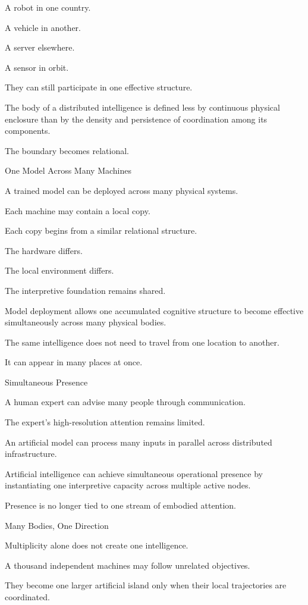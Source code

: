 A robot in one country.

A vehicle in another.

A server elsewhere.

A sensor in orbit.

They can still participate in one effective structure.

The body of a distributed intelligence is defined less by continuous physical enclosure than by the density and persistence of coordination among its components.

The boundary becomes relational.

One Model Across Many Machines

A trained model can be deployed across many physical systems.

Each machine may contain a local copy.

Each copy begins from a similar relational structure.

The hardware differs.

The local environment differs.

The interpretive foundation remains shared.

Model deployment allows one accumulated cognitive structure to become effective simultaneously across many physical bodies.

The same intelligence does not need to travel from one location to another.

It can appear in many places at once.

Simultaneous Presence

A human expert can advise many people through communication.

The expert’s high-resolution attention remains limited.

An artificial model can process many inputs in parallel across distributed infrastructure.

Artificial intelligence can achieve simultaneous operational presence by instantiating one interpretive capacity across multiple active nodes.

Presence is no longer tied to one stream of embodied attention.

Many Bodies, One Direction

Multiplicity alone does not create one intelligence.

A thousand independent machines may follow unrelated objectives.

They become one larger artificial island only when their local trajectories are coordinated.

